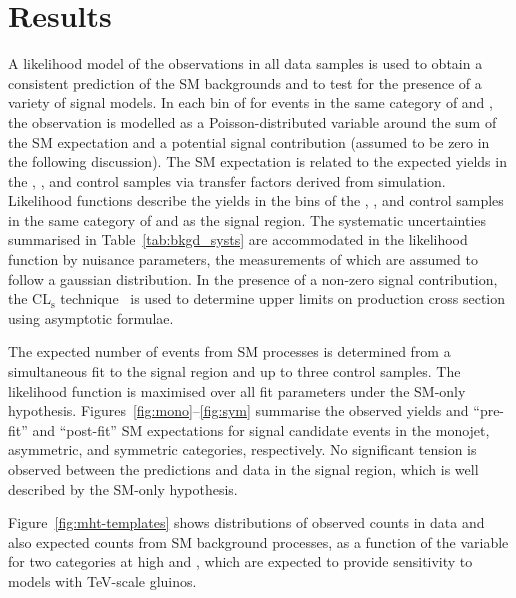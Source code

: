 \section{Results}
\label{sec:interpretation}

A likelihood model of the observations in all data samples is used to
obtain a consistent prediction of the SM backgrounds and to test for
the presence of a variety of signal models.  In each bin of \scalht
for events in the same category of \njet and \nb, the observation is
modelled as a Poisson-distributed variable around the sum of the SM
expectation and a potential signal contribution (assumed to be zero in
the following discussion). The SM expectation is related to the
expected yields in the \mj, \mmj, and \gj control samples via transfer
factors derived from simulation. Likelihood functions describe the
yields in the \scalht bins of the \mj, \mmj, and \gj control samples
in the same category of \njet and \nb as the signal region. The
systematic uncertainties summarised in Table~\ref{tab:bkgd_systs} are
accommodated in the likelihood function by nuisance parameters, the
measurements of which are assumed to follow a gaussian 
distribution. In the presence of a non-zero signal contribution, the
CL$_{\mathrm{s}}$ technique~\cite{read, Cowan:2010js} is used to
determine upper limits on production cross section using asymptotic
formulae.

The expected number of events from SM processes is determined from a
simultaneous fit to the signal region and up to three control
samples. The likelihood function is maximised over all fit parameters
under the SM-only hypothesis.
Figures~\ref{fig:mono}--\ref{fig:sym}
summarise the observed yields and ``pre-fit'' and ``post-fit'' SM
expectations for signal candidate events in the monojet, asymmetric,
and symmetric categories, respectively. No significant tension is
observed between the predictions and data in the signal region, which
is well described by the SM-only hypothesis.

Figure~\ref{fig:mht-templates} shows distributions of observed counts
in data and also expected counts from SM background processes, as a
function of the \mht variable for two \nb categories at high \njet and
\scalht, which are expected to provide sensitivity to models with
TeV-scale gluinos. 

